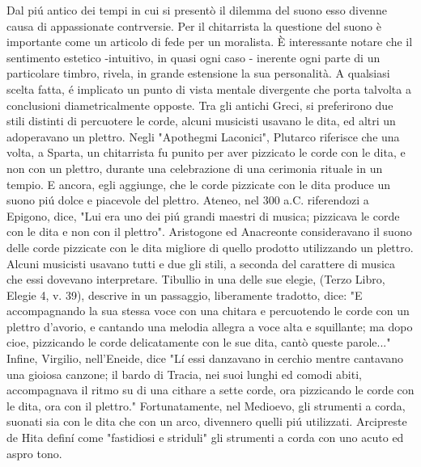 \documentclass[
10pt, %
a4paper, %
oneside, %
headinclude,footinclude, %
BCOR5mm, %
]{scrartcl}
\begin{document}
{Dal piú antico dei tempi in cui si presentò il dilemma del suono esso divenne causa di appassionate contrversie. Per il chitarrista la questione del suono è importante come un articolo di fede per un moralista. È interessante notare che il sentimento estetico -intuitivo, in quasi ogni caso - inerente ogni parte di un particolare timbro, rivela, in grande estensione la sua personalità. A qualsiasi scelta fatta, é implicato un punto di vista mentale divergente che porta talvolta a conclusioni diametricalmente opposte. Tra gli antichi Greci, si preferirono due stili distinti di percuotere le corde, alcuni musicisti usavano le dita, ed altri un adoperavano un plettro. Negli "Apothegmi Laconici", Plutarco riferisce che una volta, a Sparta, un chitarrista fu punito per aver pizzicato le corde con le dita, e non con un plettro, durante una celebrazione di una cerimonia rituale in un tempio. E ancora, egli aggiunge, che le corde pizzicate con le dita produce un suono piú dolce e piacevole del plettro. Ateneo, nel 300 a.C. riferendozi a Epigono, dice, "Lui era uno dei piú grandi maestri di musica; pizzicava le corde con le dita e non con il plettro". Aristogone ed Anacreonte consideravano il suono delle corde pizzicate con le dita migliore di quello prodotto utilizzando un plettro. Alcuni musicisti usavano tutti e due gli stili, a seconda del carattere di musica che essi dovevano interpretare. Tibullio in una delle sue elegie, (Terzo Libro, Elegie 4, v. 39), descrive in un passaggio, liberamente tradotto, dice: "E accompagnando la sua stessa voce con una chitara e percuotendo le corde con un plettro d'avorio, e cantando una melodia allegra a voce alta e squillante; ma dopo cioe, pizzicando le corde delicatamente con le sue dita, cantò queste parole..." Infine, Virgilio, nell'Eneide, dice "Lí essi danzavano in cerchio mentre cantavano una gioiosa canzone; il bardo di Tracia, nei suoi lunghi ed comodi abiti, accompagnava il ritmo su di una cithare a sette corde, ora pizzicando le corde con le dita, ora con il plettro." Fortunatamente, nel Medioevo, gli strumenti a corda, suonati sia con le dita che con un arco, divennero quelli piú utilizzati. Arcipreste de Hita definí come "fastidiosi e striduli" gli strumenti a corda con uno acuto ed aspro tono.}


\end{document}
